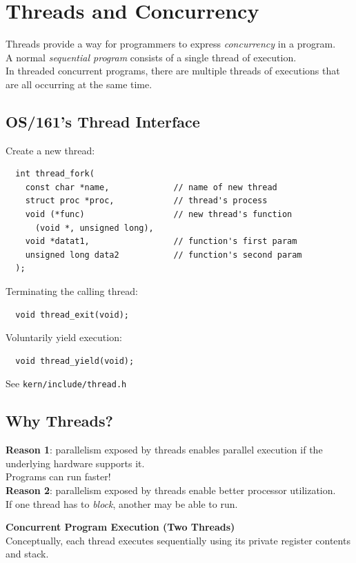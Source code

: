 \documentclass[12pt]{article}
\theoremstyle{plain}
\theoremstyle{definition}
\begin{document}
\newpage
\section{Threads and Concurrency}
Threads provide a way for programmers to express \emph{concurrency} in a program. \\
A normal \emph{sequential program} consists of a single thread of execution. \\
In threaded concurrent programs, there are multiple threads of executions that are all occurring at the same time.

\subsection{OS/161's Thread Interface}
Create a new thread:
\begin{verbatim}
  int thread_fork(
    const char *name,             // name of new thread
    struct proc *proc,            // thread's process
    void (*func)                  // new thread's function
      (void *, unsigned long),
    void *datat1,                 // function's first param
    unsigned long data2           // function's second param
  );
\end{verbatim}

Terminating the calling thread:
\begin{verbatim}
  void thread_exit(void);
\end{verbatim}

Voluntarily yield execution:
\begin{verbatim}
  void thread_yield(void);
\end{verbatim}

See \texttt{kern/include/thread.h}

\subsection{Why Threads?}
\textbf{Reason 1}: parallelism exposed by threads enables parallel execution if the underlying hardware supports it. \\
Programs can run faster! \\

\textbf{Reason 2}: parallelism exposed by threads enable better processor utilization. \\
If one thread has to \emph{block}, another may be able to run.

\textbf{Concurrent Program Execution (Two Threads)} \\
Conceptually, each thread executes sequentially using its private register contents and stack.
\end{document}
